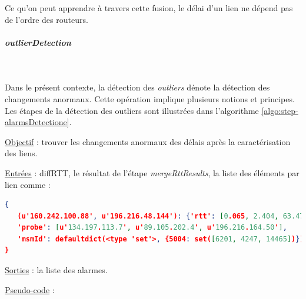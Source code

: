 Ce qu'on peut apprendre à travers cette fusion, le délai d'un lien ne dépend pas de l'ordre des routeurs.
   

  \subparagraph{outlierDetection} ~
  
  Dans le présent contexte, la détection des \textit{outliers} dénote la détection des changements anormaux. Cette opération implique plusieurs notions et principes. Les étapes de la détection des outliers sont illustrées dans l'algorithme \ref{algo:step-alarmsDetectione}. 
  
      \underline{Objectif} : trouver les changements anormaux des délais après la caractérisation des liens.
      
      \underline{Entrées} : diffRTT, le résultat de l'étape \textit{mergeRttResults},  la liste des éléments par lien comme :
      
      
 \begin{lstlisting}[language=json,firstnumber=1,basicstyle=\tiny]
{  
   (u'160.242.100.88', u'196.216.48.144'): {'rtt': [0.065, 2.404, 63.474000000000004], 
   'probe': [u'134.197.113.7', u'89.105.202.4', u'196.216.164.50'], 
   'msmId': defaultdict(<type 'set'>, {5004: set([6201, 4247, 14465])})}
} 
      \end{lstlisting}
      
      
      \underline{Sorties} : la liste des alarmes. 
      
      \underline{Pseudo-code} : 
  
